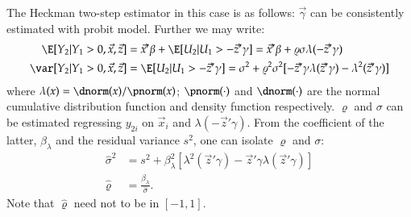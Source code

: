 \documentclass[a4paper]{article}
\numberwithin{equation}{subsection}
\begin{document}
The Heckman two-step estimator in this case is as follows:
$\vec{\gamma}$ can be consistently estimated with probit model.
Further we may write:
\begin{align}
  \E [Y_2|Y_1 > 0, \vec{x}, \vec{z}] &=
  \vec{x}' \beta + \E [U_2|U_1 > -\vec{z}' \gamma]
  = \vec{x}' \beta + \varrho\sigma\lambda(-\vec{z}' \gamma)
  \\
  \var [Y_2|Y_1 > 0, \vec{x}, \vec{z}] &=
  \E [U_2|U_1 > -\vec{z}' \gamma]
  = \sigma^2 + \varrho^2 \sigma^2
  [-\vec{z}' \gamma \lambda(\vec{z}' \gamma)
  - \lambda^2(\vec{z}' \gamma)]
\end{align}
where $\lambda(x) = \dnorm(x) / \pnorm(x)$; $\pnorm(\cdot)$ and
$\dnorm(\cdot)$ are the normal cumulative distribution function and
density function respectively.  $\varrho$ and $\sigma$ can be
estimated regressing $y_{2i}$ on $\vec{x}_i$ and $\lambda(-\vec{z}'
\gamma)$.  From the coefficient of the latter, $\beta_\lambda$ and the
residual variance $s^2$, one can isolate $\varrho$ and $\sigma$:
\begin{align}
  \hat\sigma^2 &=
  s^2 + \beta_\lambda^2 [\lambda^2(\vec{z}' \gamma) - 
  \vec{z}' \gamma \lambda(\vec{z}' \gamma)]
  \\
  \hat\varrho &=
  \frac{\beta_\lambda}{\hat\sigma}.
\end{align}
Note that $\hat\varrho$ need not to be in $[-1,1]$.
\end{document}
